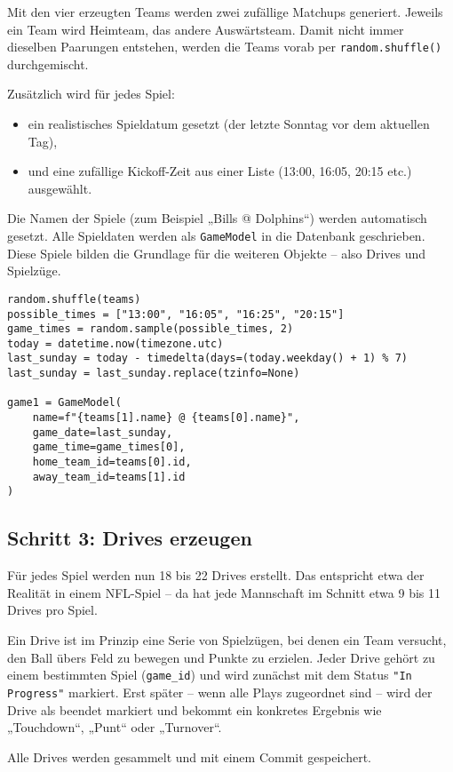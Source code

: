 Mit den vier erzeugten Teams werden zwei zufällige Matchups generiert. Jeweils ein Team wird Heimteam, das andere Auswärtsteam. Damit nicht immer dieselben Paarungen entstehen, werden die Teams vorab per \texttt{random.shuffle()} durchgemischt.

Zusätzlich wird für jedes Spiel:
\begin{itemize}
  \item ein realistisches Spieldatum gesetzt (der letzte Sonntag vor dem aktuellen Tag),
  \item und eine zufällige Kickoff-Zeit aus einer Liste (13:00, 16:05, 20:15 etc.) ausgewählt.
\end{itemize}

Die Namen der Spiele (zum Beispiel „Bills @ Dolphins“) werden automatisch gesetzt. Alle Spieldaten werden als \texttt{GameModel} in die Datenbank geschrieben. Diese Spiele bilden die Grundlage für die weiteren Objekte – also Drives und Spielzüge.

\begin{verbatim}
random.shuffle(teams)
possible_times = ["13:00", "16:05", "16:25", "20:15"]
game_times = random.sample(possible_times, 2)
today = datetime.now(timezone.utc)
last_sunday = today - timedelta(days=(today.weekday() + 1) % 7)
last_sunday = last_sunday.replace(tzinfo=None)

game1 = GameModel(
    name=f"{teams[1].name} @ {teams[0].name}",
    game_date=last_sunday,
    game_time=game_times[0],
    home_team_id=teams[0].id,
    away_team_id=teams[1].id
)
\end{verbatim}

\subsection{Schritt 3: Drives erzeugen}

Für jedes Spiel werden nun 18 bis 22 Drives erstellt. Das entspricht etwa der Realität in einem NFL-Spiel – da hat jede Mannschaft im Schnitt etwa 9 bis 11 Drives pro Spiel.

Ein Drive ist im Prinzip eine Serie von Spielzügen, bei denen ein Team versucht, den Ball übers Feld zu bewegen und Punkte zu erzielen. Jeder Drive gehört zu einem bestimmten Spiel (\texttt{game\_id}) und wird zunächst mit dem Status \texttt{"In Progress"} markiert. Erst später – wenn alle Plays zugeordnet sind – wird der Drive als beendet markiert und bekommt ein konkretes Ergebnis wie „Touchdown“, „Punt“ oder „Turnover“.

Alle Drives werden gesammelt und mit einem Commit gespeichert.

